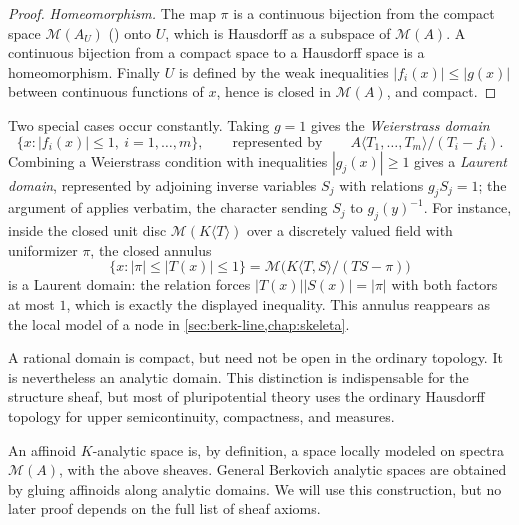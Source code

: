 \begin{proof}
\emph{Homeomorphism.}
The map $\pi$ is a continuous bijection from the compact space
$\mathcal M(A_U)$ () onto $U$, which
is Hausdorff as a subspace of $\mathcal M(A)$.  A continuous bijection
from a compact space to a Hausdorff space is a homeomorphism.  Finally
$U$ is defined by the weak inequalities $|f_i(x)|\leq|g(x)|$ between
continuous functions of $x$, hence is closed in $\mathcal M(A)$, and
compact.
\end{proof}

\begin{example}
\label{ex:berk-weierstrass-laurent}
Two special cases occur constantly.  Taking $g=1$ gives the
\emph{Weierstrass domain}
\[
 \{x:|f_i(x)|\leq1,\ i=1,\ldots,m\},
 \qquad\text{represented by}\qquad
 A\langle T_1,\ldots,T_m\rangle/(T_i-f_i).
\]
Combining a Weierstrass condition with inequalities
$|g_j(x)|\geq1$ gives a \emph{Laurent domain},
represented by adjoining inverse variables $S_j$ with relations
$g_jS_j=1$; the argument of  applies
verbatim, the character sending $S_j$ to $g_j(y)^{-1}$.  For instance,
inside the closed unit disc $\mathcal M(K\langle T\rangle)$ over a
discretely valued field with uniformizer $\pi$, the closed annulus
\[
 \{x:|\pi|\leq|T(x)|\leq1\}
 =\mathcal M\bigl(K\langle T,S\rangle/(TS-\pi)\bigr)
\]
is a Laurent domain: the relation forces $|T(x)||S(x)|=|\pi|$ with both
factors at most $1$, which is exactly the displayed inequality.  This
annulus reappears as the local model of a node in
\cref{sec:berk-line,chap:skeleta}.
\end{example}

\begin{remark}
\label{rem:berk-topology-analytic-domains}
A rational domain is compact, but need not be open in the ordinary topology.
It is nevertheless an analytic domain. This distinction is indispensable
for the structure sheaf, but most of pluripotential theory uses the ordinary
Hausdorff topology for upper semicontinuity, compactness, and measures.
\end{remark}

An affinoid $K$-analytic space is, by definition, a space locally modeled
on spectra $\mathcal M(A)$, with the above sheaves. General Berkovich
analytic spaces are obtained by gluing affinoids along analytic domains. We
will use this construction, but no later proof depends on the full list of
sheaf axioms.

